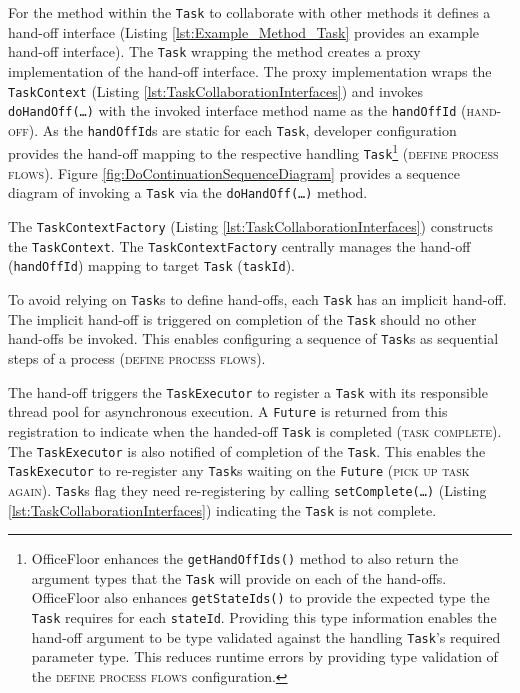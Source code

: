 \documentclass[prodmode]{style/acmlarge}
\begin{document}
For the method within the \texttt{Task} to collaborate with other methods it
defines a hand-off interface (Listing \ref{lst:Example_Method_Task} provides an
example hand-off interface).  The \texttt{Task} wrapping the method creates a
proxy implementation of the hand-off interface.  The proxy implementation wraps
the \texttt{TaskContext} (Listing \ref{lst:TaskCollaborationInterfaces}) and
invokes \texttt{doHandOff(\ldots)} with the invoked interface method name as the
\texttt{handOffId} (\textsc{hand-off}).  As the \texttt{handOffId}s are static
for each \texttt{Task}, developer configuration provides the hand-off mapping to
the respective handling \texttt{Task}\footnote{OfficeFloor enhances the
\texttt{getHandOffIds()} method to also return the argument types that the
\texttt{Task} will provide on each of the hand-offs.  OfficeFloor also enhances
\texttt{getStateIds()} to provide the expected type the \texttt{Task} requires
for each \texttt{stateId}. Providing this type information enables the hand-off
argument to be type validated against the handling \texttt{Task}'s required
parameter type.  This reduces runtime errors by providing type validation of the
\textsc{define process flows} configuration.} (\textsc{define process flows}). 
Figure \ref{fig:DoContinuationSequenceDiagram} provides a sequence diagram of
invoking a \texttt{Task} via the \texttt{doHandOff(\ldots)} method.

The \texttt{TaskContextFactory} (Listing \ref{lst:TaskCollaborationInterfaces})
constructs the \texttt{TaskContext}.  The \texttt{TaskContextFactory} centrally
manages the hand-off (\texttt{handOffId}) mapping to target \texttt{Task}
(\texttt{taskId}).

To avoid relying on \texttt{Task}s to define hand-offs, each \texttt{Task} has
an implicit hand-off.  The implicit hand-off is triggered on completion of the
\texttt{Task} should no other hand-offs be invoked.  This enables configuring a
sequence of \texttt{Task}s as sequential steps of a process (\textsc{define
process flows}).

The hand-off triggers the \texttt{TaskExecutor} to register a \texttt{Task} with
its responsible thread pool for asynchronous execution.  A \texttt{Future} is
returned from this registration to indicate when the handed-off \texttt{Task} is
completed (\textsc{task complete}).  The \texttt{TaskExecutor} is also notified
of completion of the \texttt{Task}.  This enables the \texttt{TaskExecutor} to
re-register any \texttt{Task}s waiting on the \texttt{Future} (\textsc{pick up
task again}).  \texttt{Task}s flag they need re-registering by calling
\texttt{setComplete(\ldots)} (Listing \ref{lst:TaskCollaborationInterfaces})
indicating the \texttt{Task} is not complete.
\end{document}
